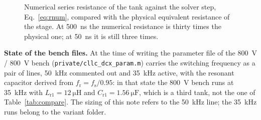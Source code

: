 \documentclass[12pt,a4paper]{scrartcl}
\newcommand{\ped}[1]{_{\mathrm{#1}}}
\newcommand{\code}[1]{\texttt{#1}}
\begin{document}
\begin{onehalfspace}
\begin{figure}[H]
	\centering
	\captionsetup{width=0.85\textwidth, font=small}
	\caption[Numerical series resistance against the solver step.]{Numerical series resistance of the tank against the solver step, Eq.~\eqref{eq:rnum}, compared with the physical equivalent resistance of the stage. At \SI{500}{\nano\second} the numerical resistance is thirty times the physical one; at \SI{50}{\nano\second} it is still three times.}
	\label{fig:rnum}
\end{figure}

\noindent\textbf{State of the bench files.} At the time of writing the parameter file of the \SI{800}{\volt} / \SI{800}{\volt} bench (\code{private/cllc\_dcx\_param.m}) carries the switching frequency as a pair of lines, \SI{50}{\kilo\hertz} commented out and \SI{35}{\kilo\hertz} active, with the resonant capacitor derived from $f\ped{r} = f\ped{s}/0.95$: in that state the \SI{800}{\volt} bench runs at \SI{35}{\kilo\hertz} with $L\ped{r1} = \SI{12}{\micro\henry}$ and $C\ped{r1} = \SI{1.56}{\micro\farad}$, which is a third tank, not the one of Table~\ref{tab:compare}. The sizing of this note refers to the \SI{50}{\kilo\hertz} line; the \SI{35}{\kilo\hertz} runs belong to the variant folder.


\end{onehalfspace}
\end{document}
